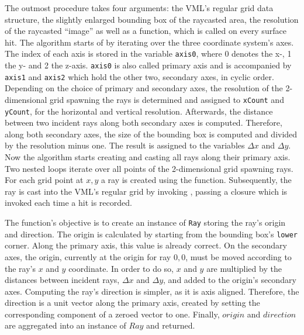 %
The outmost procedure  takes four arguments: the VML's regular grid data structure, the slightly enlarged bounding box of the raycasted area, the resolution of the raycasted \enquote{image} as well as a function, which is called on every surface hit.
The algorithm starts of by iterating over the three coordinate system's axes.
The index of each axis is stored in the variable \lstinline!axis0!, where 0 denotes the x-, 1 the y- and 2 the z-axis.
\lstinline!axis0! is also called primary axis and is accompanied by \lstinline!axis1! and \lstinline!axis2! which hold the other two, secondary axes, in cyclic order.
Depending on the choice of primary and secondary axes, the resolution of the 2-dimensional grid spawning the rays is determined and assigned to \lstinline!xCount! and \lstinline!yCount!, for the horizontal and vertical resolution.
Afterwards, the distance between two incident rays along both secondary axes is computed.
Therefore, along both secondary axes, the size of the bounding box is computed and divided by the resolution minus one.
The result is assigned to the variables $\Delta x$ and $\Delta y$.
Now the algorithm starts creating and casting all rays along their primary axis.
Two nested loops iterate over all points of the 2-dimensional grid spawning rays.
For each grid point at $x, y$ a ray is created using the  function.
Subsequently, the ray is cast into the VML's regular grid by invoking , passing a closure which is invoked each time a hit is recorded.

The  function's objective is to create an instance of \lstinline!Ray! storing the ray's origin and direction.
The origin is calculated by starting from the bounding box's \lstinline!lower! corner.
Along the primary axis, this value is already correct.
On the secondary axes, the origin, currently at the origin for ray $0, 0$, must be moved according to the ray's $x$ and $y$ coordinate.
In order to do so, $x$ and $y$ are multiplied by the distances between incident rays, $\Delta x$ and $\Delta y$, and added to the origin's secondary axes.
%
Computing the ray's direction is simpler, as it is axis aligned.
Therefore, the direction is a unit vector along the primary axis, created by setting the corresponding component of a zeroed vector to one.
%
Finally, $origin$ and $direction$ are aggregated into an instance of $Ray$ and returned.

